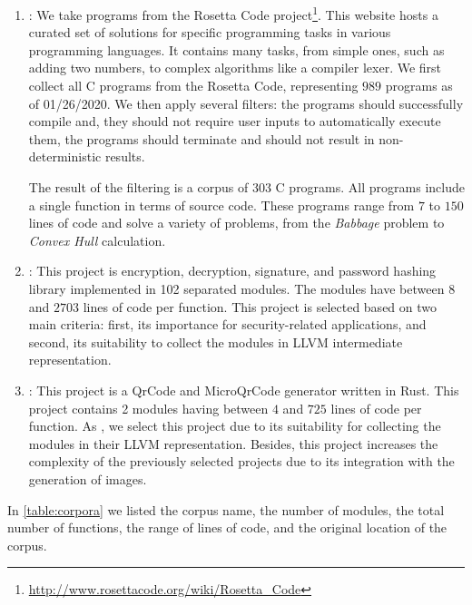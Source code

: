 \begin{enumerate}
    \item \textbf{\corpusrosetta}: We take programs from the  Rosetta Code project\footnote{\url{http://www.rosettacode.org/wiki/Rosetta_Code}}. This website hosts a curated set of solutions for specific programming tasks in various programming languages. It contains many tasks, from simple ones, such as adding two numbers, to complex algorithms like a compiler lexer. We first collect all C programs from the Rosetta Code, representing $989$ programs as of 01/26/2020. We then apply several filters: the programs should successfully compile and, they should not require user inputs to automatically execute them, the programs should terminate and should not result in non-deterministic results. 
    
    The result of the filtering is a corpus of 303 C programs. All programs include a single function in terms of source code. These programs range from $7$ to $150$ lines of code and solve a variety of problems, from the \textit{Babbage} problem to  \textit{Convex Hull} calculation.

    \item \textbf{\corpussodium}: This project is encryption, decryption, signature, and password hashing library implemented in 102 separated modules. The modules have between $8$ and $2703$ lines of code per function. This project is selected based on two main criteria: first, its importance for security-related applications, and second, its suitability to collect the modules in LLVM intermediate representation. %

    \item \textbf{\corpusqrcode}: This project is a QrCode and MicroQrCode generator written in Rust. This project contains 2 modules having between $4$ and $725$ lines of code per function. As \corpussodium, we select this project due to its suitability for collecting the modules in their LLVM representation. Besides, this project increases the complexity of the previously selected projects due to its integration with the generation of images.
    
\end{enumerate}

In \autoref{table:corpora} we listed the corpus name, the number of modules, the total number of functions, the range of lines of code, and the original location of the corpus. 




